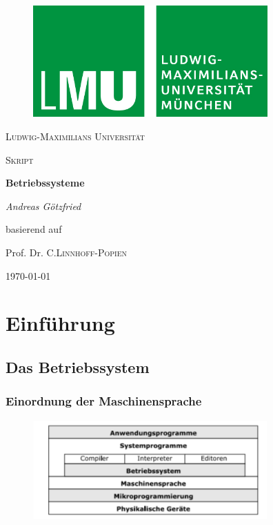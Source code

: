 \documentclass{article}
\begin{document}
\begin{titlepage}
\centering
    \begin{figure}
    \centering
	    \includegraphics[width=90mm]{logo_lmu.jpg}
    \end{figure}
	{\scshape\LARGE Ludwig-Maximilians Universität \par}
	\vspace{1cm}
	{\scshape\Large Skript \par}
	\vspace{1.5cm}
	{\huge\bfseries Betriebssysteme\par}
	\vspace{2cm}
	{\Large\itshape Andreas Götzfried\par}
    \vfill
	    basierend auf\par
	    Prof. Dr. C.\textsc{Linnhoff-Popien}
    \vfill
	{\large \today\par}
\end{titlepage}
\tableofcontents{}

\newpage
\section{Einführung}
\subsection{Das Betriebssystem}
\subsubsection{Einordnung der Maschinensprache}
    \begin{figure}[h]
        \centering
	    \includegraphics[width=90mm]{Skizzen/1_Kapitel/Hierarchie-der-Funktionen.png}
    \end{figure}
\end{document}

